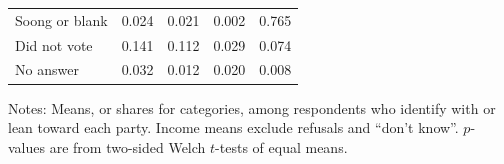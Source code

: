 \begin{table}[htbp]
\begin{tabular}{lcccc}
\quad Soong or blank & 0.024 & 0.021 & 0.002 & 0.765 \\
\quad Did not vote & 0.141 & 0.112 & 0.029 & 0.074 \\
\quad No answer & 0.032 & 0.012 & 0.020 & 0.008 \\
\bottomrule
\end{tabular}
\begin{minipage}{0.9\linewidth}\footnotesize
\vspace{4pt}Notes: Means, or shares for categories, among respondents who identify with or lean
toward each party. Income means exclude refusals and ``don't know''. $p$-values are from
two-sided Welch $t$-tests of equal means.
\end{minipage}
\end{table}
